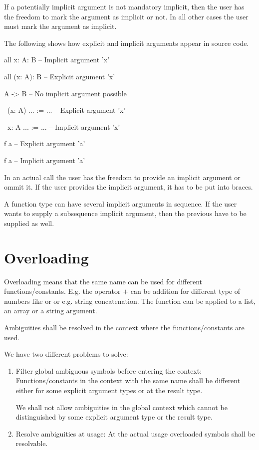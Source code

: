 If a potentially implicit argument is not mandatory implicit, then the user has
the freedom to mark the argument as implicit or not. In all other cases the user
must mark the argument as implicit.

The following shows how explicit and implicit arguments appear in source code.


\begin{alba}
    all {x: A}: B               -- Implicit argument 'x'

    all (x: A): B               -- Explicit argument 'x'

    A -> B                      -- No implicit argument possible


    \ (x: A) ... := ...         -- Explicit argument 'x'

    \ {x: A} ... := ...         -- Implicit argument 'x'


    f a                         -- Explicit argument 'a'

    f {a}                       -- Implicit argument 'a'
\end{alba}
%
In an actual call the user has the freedom to provide an implicit argument or
ommit it. If the user provides the implicit argument, it has to be put into
braces.

A function type can have several implicit arguments in sequence. If the user
wants to supply a subsequence implicit argument, then the previous have to be
supplied as well.











\vskip 5mm
\section{Overloading}

Overloading means that the same name can be used for different
functions/constants. E.g. the operator $+$ can be addition for different type of
numbers like  or  or e.g. string concatenation. The
function  can be applied to a list, an array or a string argument.

Ambiguities shall be resolved in the context where the functions/constants are
used.

We have two different problems to solve:
\begin{enumerate}

\item Filter global ambiguous symbols before entering the context:
Functions/constants in the context with the same name shall be different either
for some explicit argument types or at the result type.

We shall not allow ambiguities in the global context which cannot be
distinguished by some explicit argument type or the result type.


\item Resolve ambiguities at usage: At the actual usage overloaded symbols shall
be resolvable.

\end{enumerate}

